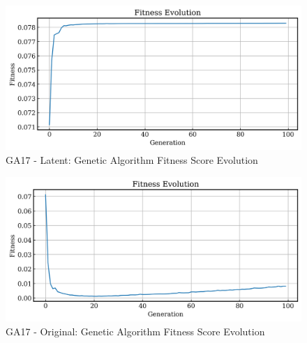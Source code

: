 \documentclass{article}
\begin{document}
\begin{figure}[H]
    \centering
    \includegraphics[width=0.75\linewidth]{figures/GAResults/GA17/latent/100gen_fitness.png}
    \caption{GA17 - Latent: Genetic Algorithm Fitness Score Evolution}
    \label{fig:GA17_latent_fitness}
\end{figure}
\begin{figure}[H]
    \centering
    \includegraphics[width=0.75\linewidth]{figures/GAResults/GA17/original/original_fitness.png}
    \caption{GA17 - Original: Genetic Algorithm Fitness Score Evolution}
    \label{fig:GA17_original_fitness}
\end{figure}
\end{document}
